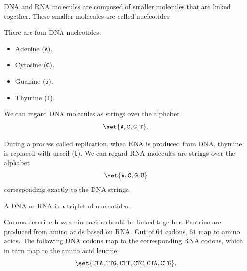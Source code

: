 \begin{example}
\begin{thmenum}
     DNA and RNA molecules are composed of smaller molecules that are linked together. These smaller molecules are called nucleotides.

    There are four DNA nucleotides:
    \begin{itemize}
      \item Adenine (\texttt{A}).
      \item Cytosine (\texttt{C}).
      \item Guanine (\texttt{G}).
      \item Thymine (\texttt{T}).
    \end{itemize}

    We can regard DNA molecules as strings over the alphabet
    \begin{equation*}
      \set{ \texttt{A}, \texttt{C}, \texttt{G}, \texttt{T} }.
    \end{equation*}

    During a process called replication, when RNA is produced from DNA, thymine is replaced with uracil (\texttt{U}). We can regard RNA molecules are strings over the alphabet
    \begin{equation*}
      \set{ \texttt{A}, \texttt{C}, \texttt{G}, \texttt{U} }
    \end{equation*}
    corresponding exactly to the DNA strings.

    A DNA or RNA  is a triplet of nucleotides.

    Codons describe how amino acids should be linked together. Proteins are produced from amino acids based on RNA. Out of \( 64 \) codons, \( 61 \) map to amino acids. The following DNA codons map to the corresponding RNA codons, which in turn map to the amino acid leucine:
    \begin{equation*}
       \set{ \texttt{TTA}, \texttt{TTG}, \texttt{CTT}, \texttt{CTC}, \texttt{CTA}, \texttt{CTG} }.
    \end{equation*}
  \end{thmenum}
\end{example}

